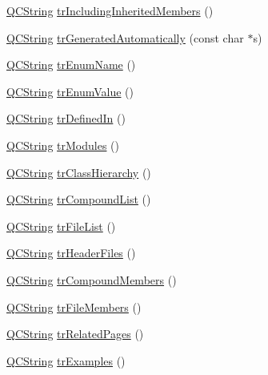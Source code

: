 \begin{DoxyCompactItemize}
\item 
\hyperlink{class_q_c_string}{Q\-C\-String} \hyperlink{class_translator_polish_aac1033d8aaef30fde3dc36b7c207820d}{tr\-Including\-Inherited\-Members} ()
\item 
\hyperlink{class_q_c_string}{Q\-C\-String} \hyperlink{class_translator_polish_ae1830086931960c6fed36f1e7ea2e276}{tr\-Generated\-Automatically} (const char $\ast$s)
\item 
\hyperlink{class_q_c_string}{Q\-C\-String} \hyperlink{class_translator_polish_a7a6e29ca486072455bf3083ba8acfc18}{tr\-Enum\-Name} ()
\item 
\hyperlink{class_q_c_string}{Q\-C\-String} \hyperlink{class_translator_polish_a8504c48d2e7c98cdc58adb8c413bb583}{tr\-Enum\-Value} ()
\item 
\hyperlink{class_q_c_string}{Q\-C\-String} \hyperlink{class_translator_polish_a5808bd55db4b980bf98c20386a6f7766}{tr\-Defined\-In} ()
\item 
\hyperlink{class_q_c_string}{Q\-C\-String} \hyperlink{class_translator_polish_a7e7c4c8a0ebc34babcc72f2bf0b6a7e4}{tr\-Modules} ()
\item 
\hyperlink{class_q_c_string}{Q\-C\-String} \hyperlink{class_translator_polish_a2d2a657e41d15d96eef584d0b16ac838}{tr\-Class\-Hierarchy} ()
\item 
\hyperlink{class_q_c_string}{Q\-C\-String} \hyperlink{class_translator_polish_a89f7ed81df77d5e01296302aa818dced}{tr\-Compound\-List} ()
\item 
\hyperlink{class_q_c_string}{Q\-C\-String} \hyperlink{class_translator_polish_ad08ad4ba93076dfedb11dc43ca915a24}{tr\-File\-List} ()
\item 
\hyperlink{class_q_c_string}{Q\-C\-String} \hyperlink{class_translator_polish_ab4e1e34171cba6f10a9940de10176551}{tr\-Header\-Files} ()
\item 
\hyperlink{class_q_c_string}{Q\-C\-String} \hyperlink{class_translator_polish_acca37a92198919ac1908fd388ed78659}{tr\-Compound\-Members} ()
\item 
\hyperlink{class_q_c_string}{Q\-C\-String} \hyperlink{class_translator_polish_a2dc4f441708f3450ac98024452bac1d0}{tr\-File\-Members} ()
\item 
\hyperlink{class_q_c_string}{Q\-C\-String} \hyperlink{class_translator_polish_ac3e324016cdf6853802ffdf387a229a8}{tr\-Related\-Pages} ()
\item 
\hyperlink{class_q_c_string}{Q\-C\-String} \hyperlink{class_translator_polish_a49399a22bda9ddf0ad639669581002d4}{tr\-Examples} ()
\item 

\end{DoxyCompactItemize}
